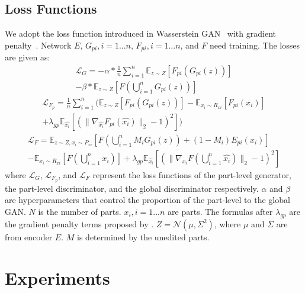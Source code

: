 \documentclass[letterpaper]{article} %
\begin{document}
\subsection{Loss Functions}

We adopt the loss function introduced in Wasserstein GAN~\citep{pmlr-v70-arjovsky17a} with gradient penalty~\citep{NIPS2017_892c3b1c}. Network $E$, $G_{pi}, i=1...n$, $F_{pi}, i=1...n$, and $F$ need training. The losses are given as: 
\begin{equation}
\begin{gathered}
    \mathcal{L}_G = -\alpha*\frac{1}{n}\sum_{i=1}^n \mathbb{E}_{z \sim Z}[F_{pi}(G_{pi}(z))] \\
    - \beta*\mathbb{E}_{z \sim Z}[F(\bigcup_{i=1}^n G_{pi}(z))]
\end{gathered}
\end{equation}
\begin{equation}
\begin{gathered}
    \mathcal{L}_{F_p} = \frac{1}{n}\sum_{i=1}^n (\mathbb{E}_{z \sim Z}[F_{pi}(G_{pi}(z))] 
    - \mathbb{E}_{x_i \sim R_{xi}}[F_{pi}(x_i)] \\
    + \lambda_{gp} \mathbb{E}_{\hat{x_i}}[(\lVert \nabla_{\hat{x_i}} F_{pi}(\hat{x_i}) \rVert_2 - 1)^2])
\end{gathered}
\end{equation}
\begin{equation}
\begin{gathered}
    \mathcal{L}_F = \mathbb{E}_{z \sim Z, x_i \sim P_{xi}}[F(\bigcup_{i=1}^n M_i G_{pi}(z)) 
    + (1-M_i) E_{pi}(x_i)] \\
    - \mathbb{E}_{x_i \sim R_{xi}}[F(\bigcup_{i=1}^n x_i)] 
    + \lambda_{gp} \mathbb{E}_{\hat{x_i}}[(\lVert \nabla_{\hat{x_i}} F(\bigcup_{i=1}^n \hat{x_i}) \rVert_2 - 1)^2]
\end{gathered}
\end{equation}
where $\mathcal{L}_G$, $\mathcal{L}_{F_p}$, and $\mathcal{L}_F$ represent the loss functions of the part-level generator, the part-level discriminator, and the global discriminator respectively. $\alpha$ and $\beta$ are hyperparameters that control the proportion of the part-level to the global GAN. $N$ is the number of parts. $x_i, i=1...n$ are parts. The formulas after $\lambda_{gp}$ are the gradient penalty terms proposed by \citet{NIPS2017_892c3b1c}. $Z=\mathcal{N}(\mu, \Sigma^2)$, where $\mu$ and $\Sigma$ are from encoder $E$. $M$ is determined by the unedited parts.


\section{Experiments}
\end{document}
